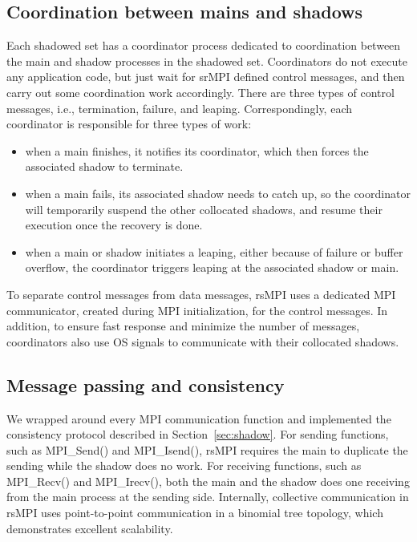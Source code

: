 \subsection{Coordination between mains and shadows}
Each shadowed set has a coordinator process dedicated to coordination between the main and shadow processes in the shadowed set. 
Coordinators do not execute any application code, but just wait for srMPI defined control messages, and then carry out some 
coordination work accordingly. There are three types of control messages, i.e., termination, failure, and leaping. Correspondingly, each coordinator is responsible for three types of work:
\begin{itemize}
  \item when a main finishes, it notifies its coordinator, which then forces the associated shadow to terminate.
  \item when a main fails, its associated shadow needs to catch up, so the coordinator will temporarily suspend the other collocated shadows, and resume their execution once the recovery is done.
  \item when a main or shadow initiates a leaping, either because of failure or buffer overflow, the coordinator triggers leaping at the associated shadow or main.
\end{itemize}
To separate control messages from data messages, rsMPI uses a dedicated MPI communicator, created during MPI initialization, for the control messages. In addition, to ensure fast response and minimize the number of messages, coordinators also use OS signals to communicate with their collocated shadows. %

\subsection{Message passing and consistency}
We wrapped around every MPI communication function and implemented the consistency protocol described in Section~\ref{sec:shadow}. For sending functions, such as MPI\_Send() and MPI\_Isend(), rsMPI requires the main to duplicate the sending while the shadow does no work. For receiving functions, such as MPI\_Recv() and MPI\_Irecv(), both the main and the shadow does one receiving from the main process at the sending side. Internally, collective communication in rsMPI uses point-to-point communication in a binomial tree topology, which demonstrates excellent scalability.

